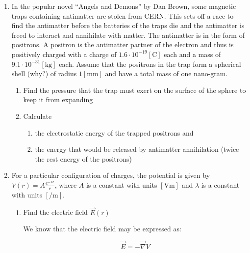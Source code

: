 \begin{enumerate}

  \item In the popular novel ``Angels and Demons'' by Dan Brown, some magnetic traps containing antimatter are stolen from CERN. This sets off a race to find the antimatter before the batteries of the traps die and the antimatter is freed to interact and annihilate with matter. The antimatter is in the form of positrons. A positron is the antimatter partner of the electron and thus is positively charged with a charge of $1.6\cdot10^{-19}[\si{\coulomb}]$ each and a mass of $9.1\cdot10^{−31}[\si{\kilo\gram}]$ each. Assume that the positrons in the trap form a spherical shell (why?) of radius $1[\si{\milli\meter}]$ and have a total mass of one nano-gram.

    \begin{enumerate}

      \item Find the pressure that the trap must exert on the surface of the sphere to keep it from expanding

      \item Calculate 

        \begin{enumerate}

          \item the electrostatic energy of the trapped positrons and

          \item the energy that would be released by antimatter annihilation (twice the rest energy of the positrons)

        \end{enumerate} 

    \end{enumerate}

  \item For a particular configuration of charges, the potential is given by $V(r)=A\frac{e^{-\lambda r}}{r}$, where $A$ is a constant with units $[\si{\volt\meter}]$ and $\lambda$ is a constant with units $[\si{\per\meter}]$.

    \begin{enumerate}

      \item Find the electric field $\vec{E}(r)$

        We know that the electric field may be expressed as:

        $$\vec{E}=-\vec{\nabla}V$$


\end{enumerate}
\end{enumerate}
